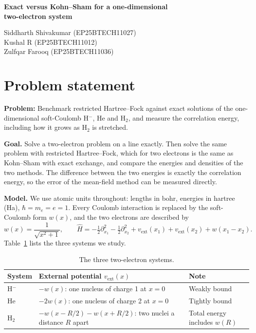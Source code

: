 \documentclass[11pt,a4paper]{article}
\begin{document}
\begin{center}
  {\LARGE\bfseries Exact versus Kohn--Sham for a one-dimensional\\[2pt] two-electron system\par}
  \vspace{12pt}
  {\large Siddharth Shivakumar (EP25BTECH11027)\\[2pt]
   Kushal R (EP25BTECH11012)\\[2pt]
   Zulfqar Farooq (EP25BTECH11036)\par}
\end{center}
\vspace{4pt}

{\small\tableofcontents}

\newpage
\section{Problem statement}

\textbf{Problem:} Benchmark restricted Hartree--Fock against exact solutions of the one-dimensional
soft-Coulomb H$^-$, He and H$_2$, and measure the correlation energy, including how it grows as H$_2$ is stretched.

\textbf{Goal.} Solve a two-electron problem on a line exactly. Then solve the same problem with restricted
Hartree--Fock, which for two electrons is the same as Kohn--Sham with exact exchange, and compare the energies and
densities of the two methods. The difference between the two energies is exactly the correlation energy, so the
error of the mean-field method can be measured directly.

\textbf{Model.} We use atomic units throughout: lengths in bohr, energies in hartree (Ha), $\hbar=m_e=e=1$. Every
Coulomb interaction is replaced by the soft-Coulomb form $w(x)$, and the two electrons are described by
\begin{equation}
  w(x)=\frac{1}{\sqrt{x^2+1}},\qquad
  \hat H=-\tfrac12\partial_{x_1}^2-\tfrac12\partial_{x_2}^2+v_\text{ext}(x_1)+v_\text{ext}(x_2)+w(x_1-x_2).
\end{equation}
Table~\ref{tab:systems} lists the three systems we study.

\begin{table}[H]
\centering\small
\begin{tabular}{@{}lll@{}}
\toprule
System & External potential $v_\text{ext}(x)$ & Note\\
\midrule
H$^-$ & $-w(x)$: one nucleus of charge 1 at $x=0$ & Weakly bound\\
He    & $-2w(x)$: one nucleus of charge 2 at $x=0$ & Tightly bound\\
H$_2$ & $-w(x-R/2)-w(x+R/2)$: two nuclei a distance $R$ apart & Total energy includes $w(R)$\\
\bottomrule
\end{tabular}
\caption{The three two-electron systems.}
\label{tab:systems}
\end{table}
\end{document}
